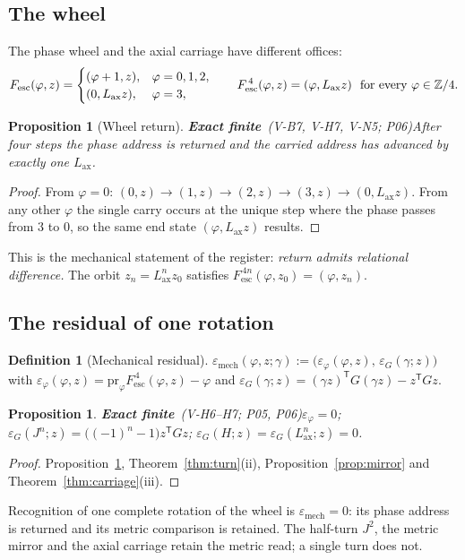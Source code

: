 \documentclass[11pt,a4paper]{article}
\newcommand{\tp}{^{\mathsf T}}
\newcommand{\Lax}{L_{\mathrm{ax}}}\newcommand{\Lpr}{L_{\mathrm{pr}}}
\newcommand{\Fesc}{F_{\mathrm{esc}}}
\newcommand{\emech}{\varepsilon_{\mathrm{mech}}}\newcommand{\eHS}{\varepsilon_{\mathrm{HS}}}
\newcommand{\st}[1]{\textsf{\small\textbf{#1}}}
\newcommand{\Sfin}{\st{Exact finite}}\newcommand{\Sder}{\st{Exact derived}}
\theoremstyle{plain}
\newtheorem{prop}[thm]{Proposition}
\theoremstyle{definition}
\newtheorem{defn}[thm]{Definition}
\theoremstyle{remark}
\begin{document}
\subsection{The wheel}
The phase wheel and the axial carriage have different offices:
\[
\Fesc(\varphi,z)=\begin{cases}(\varphi+1,z),&\varphi=0,1,2,\\(0,\Lax z),&\varphi=3,\end{cases}\qquad
\Fesc^{\,4}(\varphi,z)=(\varphi,\Lax z)\ \text{ for every }\varphi\in\ZZ/4.
\]
\begin{prop}[Wheel return]\Sfin\ \textit{(V-B7, V-H7, V-N5; P06)}\label{prop:wheel}
After four steps the phase address is returned and the carried address has advanced by exactly one $\Lax$.
\end{prop}
\begin{proof}
From $\varphi=0$: $(0,z)\to(1,z)\to(2,z)\to(3,z)\to(0,\Lax z)$. From any other $\varphi$ the single carry occurs at the unique step where the phase passes from $3$ to $0$, so the same end state $(\varphi,\Lax z)$ results.
\end{proof}
This is the mechanical statement of the register: \emph{return admits relational difference.} The orbit $z_n=\Lax^nz_0$ satisfies $\Fesc^{\,4n}(\varphi,z_0)=(\varphi,z_n)$.

\subsection{The residual of one rotation}
\begin{defn}[Mechanical residual]
$\emech(\varphi,z;\gamma):=\bigl(\varepsilon_\varphi(\varphi,z),\,\varepsilon_G(\gamma;z)\bigr)$ with $\varepsilon_\varphi(\varphi,z)=\mathrm{pr}_\varphi\Fesc^{\,4}(\varphi,z)-\varphi$ and $\varepsilon_G(\gamma;z)=(\gamma z)\tp G(\gamma z)-z\tp Gz$.
\end{defn}
\begin{prop}\Sfin\ \textit{(V-H6--H7; P05, P06)}\label{prop:resid}
$\varepsilon_\varphi=0$; $\varepsilon_G(J^n;z)=\bigl((-1)^n-1\bigr)z\tp Gz$; $\varepsilon_G(H;z)=\varepsilon_G(\Lax^n;z)=0$.
\end{prop}
\begin{proof}
Proposition~\ref{prop:wheel}, Theorem~\ref{thm:turn}(ii), Proposition~\ref{prop:mirror} and Theorem~\ref{thm:carriage}(iii).
\end{proof}
Recognition of one complete rotation of the wheel is $\emech=0$: its phase address is returned and its metric comparison is retained. The half-turn $J^2$, the metric mirror and the axial carriage retain the metric read; a single turn does not.
\end{document}
